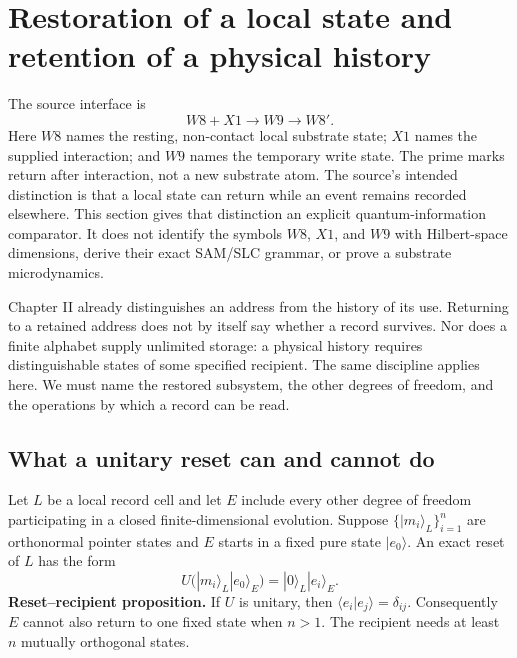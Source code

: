 \section{Restoration of a local state and retention of a physical history}
\label{sec:restoration-history}

The source interface is
\begin{equation}
 W8+X1\longrightarrow W9\longrightarrow W8'.
 \label{eq:write-interface}
\end{equation}
Here $W8$ names the resting, non-contact local substrate state; $X1$
names the supplied interaction; and $W9$ names the temporary write state.
The prime marks return after interaction, not a new substrate atom.
The source's intended distinction is that a local state can return while
an event remains recorded elsewhere. This section gives that distinction
an explicit quantum-information comparator. It does not identify the
symbols $W8$, $X1$, and $W9$ with Hilbert-space dimensions, derive their
exact SAM/SLC grammar, or prove a substrate microdynamics.

Chapter II already distinguishes an address from the history of its use.
Returning to a retained address does not by itself say whether a record
survives. Nor does a finite alphabet supply unlimited storage: a physical
history requires distinguishable states of some specified recipient.
The same discipline applies here. We must name the restored subsystem,
the other degrees of freedom, and the operations by which a record can
be read.

\subsection{What a unitary reset can and cannot do}
\label{subsec:reset-theorem}

Let $L$ be a local record cell and let $E$ include every other degree of
freedom participating in a closed finite-dimensional evolution. Suppose
$\{|m_i\rangle_L\}_{i=1}^n$ are orthonormal pointer states and $E$ starts
in a fixed pure state $|e_0\rangle$. An exact reset of $L$ has the form
\begin{equation}
 U\bigl(|m_i\rangle_L|e_0\rangle_E\bigr)
   =|0\rangle_L|e_i\rangle_E.
 \label{eq:unitary-reset}
\end{equation}
\noindent\textbf{Reset--recipient proposition.}
If $U$ is unitary, then $\langle e_i|e_j\rangle=\delta_{ij}$.
Consequently $E$ cannot also return to one fixed state when $n>1$.
The recipient needs at least $n$ mutually orthogonal states.

